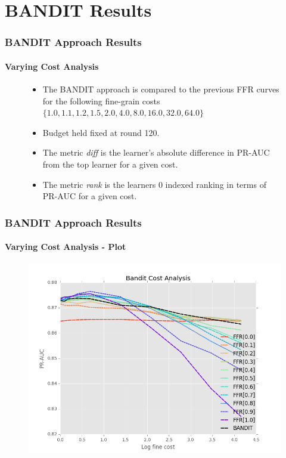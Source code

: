 \documentclass{beamer}
\begin{document}
\section{BANDIT Results}
\begin{frame}
    \frametitle{BANDIT Approach Results}  %
    \framesubtitle{Varying Cost Analysis}
    \begin{figure}[!htb]
        \begin{itemize}
      \item The BANDIT approach is compared to the previous FFR curves for the
      following fine-grain costs $\{1.0, 1.1, 1.2, 1.5, 2.0, 4.0, 8.0, 16.0, 32.0, 64.0\}$
      \item Budget held fixed at round 120.
      \item The metric \textit{diff} is the learner's absolute difference
     in PR-AUC from the top learner for a given cost.
     \item The metric \textit{rank} is the learners
     $0$ indexed ranking in terms of PR-AUC for a given cost.
    \end{itemize}
    \end{figure}
\end{frame}
\begin{frame}
    \frametitle{BANDIT Approach Results}  %
    \framesubtitle{Varying Cost Analysis - Plot}
    \begin{figure}[!htb]
        \centering
        \includegraphics[width=0.80\columnwidth]{fig/BanditPlotLogFine}
        \label{fig:BanditPlotLogFine}
    \end{figure}
\end{frame}
\end{document}
